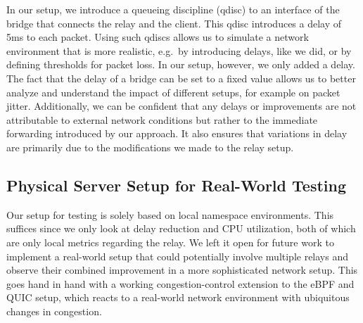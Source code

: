 
In our setup, we introduce a queueing discipline (qdisc) to an interface
of the bridge that connects the relay and the client.
This qdisc introduces a delay of 5ms to each packet.
Using such qdiscs allows us to simulate a network environment that is more realistic, 
e.g.~by introducing delays, like we did, or by defining thresholds for packet loss.
In our setup, however, we only added a delay. %
The fact that the delay of a bridge can be set to a fixed value allows us to better 
analyze and understand the impact of different setups, for example on packet jitter.
Additionally, we can be confident that any delays or improvements are not attributable 
to external network conditions but rather to the immediate forwarding introduced by our approach. 
It also ensures that variations in delay are primarily due to the modifications we made to 
the relay setup.

\subsection{Physical Server Setup for Real-World Testing}\label{subsec:physical_server_setup}
Our setup for testing is solely based on local namespace environments.
This suffices since we only look at delay reduction and CPU utilization, 
both of which are only local metrics regarding the relay.
We left it open for future work to implement a real-world setup that 
could potentially involve multiple relays and observe their combined improvement
in a more sophisticated network setup.
This goes hand in hand with a working congestion-control extension to the eBPF and 
QUIC setup, which reacts to a real-world network environment with ubiquitous changes 
in congestion.

